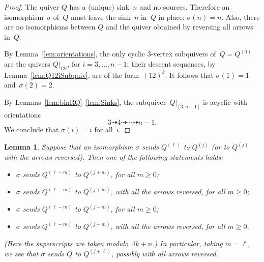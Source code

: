 \documentclass[11pt, letterpaper]{amsart}
\newtheorem{lemma}[theorem]{Lemma}
\theoremstyle{definition}
\numberwithin{equation}{section}
\newcommand{\points}{\!\dasharrow\!}
\begin{document}
\begin{proof}
The quiver $Q$ has a (unique) sink~$n$ and no sources. 
Therefore an isomorphism~$\sigma$ of~$Q$
must leave the sink~$n$ in~$Q$ in place: $\sigma(n)=n$.
Also, there are no isomorphisms between $Q$ and the quiver obtained by reversing all arrows in~$Q$. 

By Lemma~\ref{lem:orientations}, the only cyclic 3-vertex subquivers of~$Q=Q^{(0)}$ are 
the quivers $Q|_{12i}$, for $i=3,\dots,n-1$;
their descent sequences, by Lemma~\ref{lem:Q12iSubquiv}, are of the form~$(12)^k$.  
It follows that ${\sigma(1)=1}$ and~${\sigma(2)=2}$.  

By Lemmas~\ref{lem:binRQ}--\ref{lem:Sinks}, the subquiver~$Q|_{[3,n-1]}$ is acyclic with orientations 
\begin{equation*}
3 \points 4 \points \cdots \points n-1.  
\end{equation*}
We conclude that $\sigma(i)=i$ for all~$i$.
\end{proof}

\begin{lemma}
\label{lem:isosMove}
Suppose that an isomorphism $\sigma$ sends $Q^{(\ell)}$ to $Q^{(j)}$ (or to $Q^{(j)}$ with the arrows reversed). 
Then one of the following statements holds: 
\begin{itemize}[leftmargin=.2in]
\item 
$\sigma$ sends $Q^{(\ell-m)}$ to $Q^{(j+m)}$, for all $m \geq 0$; 
\item 
$\sigma$ sends $Q^{(\ell-m)}$ to $Q^{(j+m)}$, with all the arrows reversed, for all $m \geq 0$; 
\item 
$\sigma$ sends $Q^{(\ell-m)}$ to $Q^{(j-m)}$, for all $m \geq 0$;
\item 
$\sigma$ sends $Q^{(\ell-m)}$ to $Q^{(j-m)}$, with all the arrows reversed, for all $m \geq 0$.
\end{itemize}
(Here the superscripts are taken modulo~$4k+n$.) 
In particular, taking $m=\ell$, we see that $\sigma$ sends $Q$ to $Q^{(j \pm \ell)}$, possibly with all arrows reversed.
\end{lemma}
\end{document}
